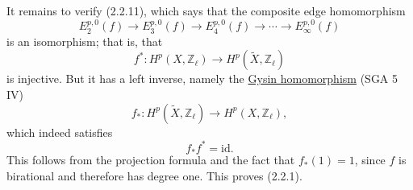 It remains to verify (2.2.11), which says that the composite edge
homomorphism
\begin{equation}\tag{2.2.15}
E_2^{p,0}(f)\longrightarrow E_3^{p,0}(f)
\longrightarrow E_4^{p,0}(f)\longrightarrow\cdots
\longrightarrow E_\infty^{p,0}(f)
\end{equation}
is an isomorphism; that is, that
\begin{equation}\tag{2.2.16}
f^*:H^p(X,\mathbb Z_\ell)
\longrightarrow H^p(\widetilde X,\mathbb Z_\ell)
\end{equation}
is injective. But it has a left inverse, namely the
\underline{Gysin homomorphism} (SGA 5 IV)
\begin{equation}\tag{2.2.17}
f_*:H^p(\widetilde X,\mathbb Z_\ell)
\longrightarrow H^p(X,\mathbb Z_\ell),
\end{equation}
which indeed satisfies
\begin{equation}\tag{2.2.18}
f_*f^*=\mathrm{id}.
\end{equation}
This follows from the projection formula and the fact that $f_*(1)=1$, since
$f$ is birational and therefore has degree one. This proves (2.2.1).

